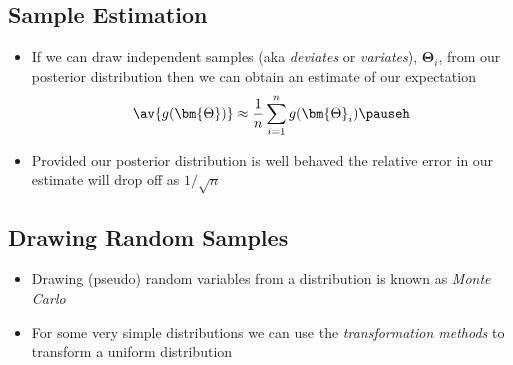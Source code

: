 
\begin{slide}
\section[-2]{Sample Estimation}

\pb\pause{}
\begin{itemize}
\item If we can draw independent samples (aka \emph{deviates} or
  \emph{variates}), $\bm{\Theta}_i$, from our posterior distribution then we can
  obtain an estimate of our expectation
  \begin{align*}
    \av{g(\bm{\Theta})} \approx \frac{1}{n} \sum_{i=1}^n g(\bm{\Theta}_i)\pauseh
  \end{align*}
\item Provided our posterior distribution is well behaved the
  relative error in our estimate will drop off as $1/\sqrt{n}$\pauseh
  \begin{center}
    \pause   
  \end{center}
\end{itemize}

\end{slide}

\Outline %

\begin{slide}
\section[-2]{Drawing Random Samples}

\pb
\begin{itemize}
\item Drawing (pseudo) random variables from a distribution is known
  as \emph{Monte Carlo}\pauseh
\item For some very simple distributions we can use the \emph{transformation
  methods} to transform a uniform distribution\pauseh
\end{itemize}
\begin{center}
  \pause
\end{center}

\end{slide}

